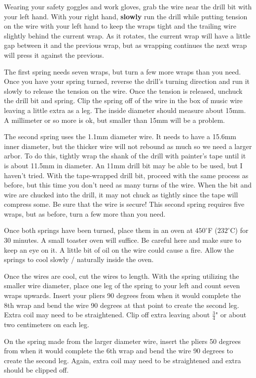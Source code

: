 \documentclass[openany]{book}
\begin{document}
Wearing your safety goggles and work gloves, grab the wire near the drill bit with your left hand. With your right hand, \textbf{slowly} run the drill while putting tension on the wire with your left hand to keep the wraps tight and the trailing wire slightly behind the current wrap. As it rotates, the current wrap will have a little gap between it and the previous wrap, but as wrapping continues the next wrap will press it against the previous.

The first spring needs seven wraps, but turn a few more wraps than you need. Once you have your spring turned, reverse the drill’s turning direction and run it slowly to release the tension on the wire. Once the tension is released, unchuck the drill bit and spring. Clip the spring off of the wire in the box of music wire leaving a little extra as a leg. The inside diameter should measure about 15mm. A millimeter or so more is ok, but smaller than 15mm will be a problem.

The second spring uses the 1.1mm diameter wire. It needs to have a 15.6mm inner diameter, but the thicker wire will not rebound as much so we need a larger arbor. To do this, tightly wrap the shank of the drill with painter’s tape until it is about 11.5mm in diameter. An 11mm drill bit may be able to be used, but I haven’t tried. With the tape-wrapped drill bit, proceed with the same process as before, but this time you don’t need as many turns of the wire. When the bit and wire are chucked into the drill, it may not chuck as tightly since the tape will compress some. Be sure that the wire is secure! This second spring requires five wraps, but as before, turn a few more than you need.

Once both springs have been turned, place them in an oven at $450^\circ$F ($232^\circ$C) for 30 minutes. A small toaster oven will suffice. Be careful here and make sure to keep an eye on it. A little bit of oil on the wire could cause a fire. Allow the springs to cool slowly / naturally inside the oven. 

Once the wires are cool, cut the wires to length. With the spring utilizing the smaller wire diameter, place one leg of the spring to your left and count seven wraps upwards. Insert your pliers 90 degrees from when it would complete the 8th wrap and bend the wire 90 degrees at that point to create the second leg. Extra coil may need to be straightened. Clip off extra leaving about $\frac{3}{4}$" or about two centimeters on each leg.

On the spring made from the larger diameter wire, insert the pliers 50 degrees from when it would complete the 6th wrap and bend the wire 90 degrees to create the second leg. Again, extra coil may need to be straightened and extra should be clipped off.
\end{document}
